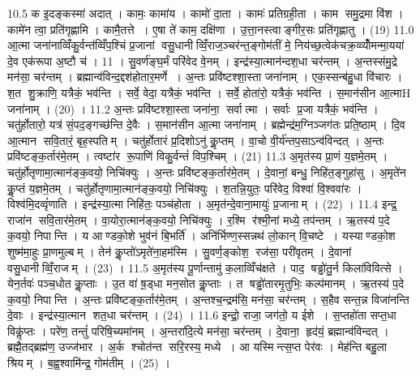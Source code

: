 10.5
क इ॒दङ्कस्मा॑ अदात् । कामः॒ कामा॑य । कामो॑ दा॒ता । कामः॑ प्रतिग्रही॒ता । काम समु॒द्रमा वि॑श । कामे॑न त्वा॒ प्रति॑गृह्णामि । कामै॒तत्ते । ए॒षा ते॑ काम॒ दक्षि॑णा । उ॒त्ता॒नस्त्वाङ्गीर॒सः प्रति॑गृह्णातु । (19)
11.0
आ॒त्मा जना॑नाव्विँकु॒र्वन्त॑व्विँप॒श्चिं प्र॒जानां वसु॒धानीव्विँ॒राज॒ञ्चर॑न्त॒ङ्गोम॑तीं मे॒ निय॑च्छ॒त्वेक॑चक्र॒व्व्योँ॑मन्मा॒यया॑ दे॒व एक॑रूपा अ॒ष्टौ च॑ । 11 ।
सु॒वर्ण॑ङ्घ॒र्मं परि॑वेद वे॒नम् । इन्द्र॑स्या॒त्मान॑न्दश॒धा चर॑न्तम् । अ॒न्तस्स॑मु॒द्रे मन॑सा॒ चर॑न्तम् । ब्रह्मान्व॑विन्द॒द्दश॑होतार॒मर्णे । अ॒न्तः प्रवि॑ष्टश्शा॒स्ता जना॑नाम् । एक॒स्सन्ब॑हु॒धा वि॑चारः । श॒त शु॒क्राणि॒ यत्रैकं॒ भव॑न्ति । सर्वे॒ वेदा॒ यत्रैकं॒ भव॑न्ति । सर्वे॒ होता॑रो॒ यत्रैकं॒ भव॑न्ति । स॒मान॑सीन आ॒त्माH जना॑नाम् । (20) ।
11.2
अ॒न्तः प्रवि॑ष्टश्शा॒स्ता जना॑ना॒ सर्वात्मा । सर्वाः प्र॒जा यत्रैकं॒ भव॑न्ति । चतु॑र्\mbox{}होतारो॒ यत्र॑ सं॒पद॒ङ्गच्छ॑न्ति दे॒वैः । स॒मान॑सीन आ॒त्मा जना॑नाम् । ब्रह्मेन्द्र॑म॒ग्निञ्जग॑तः प्रति॒ष्ठाम् । दि॒व आ॒त्मान सवि॒तारं॒ बृह॒स्पतिम् । चतु॑र्\mbox{}होतारं प्र॒दिशोऽनु॑ कॢ॒प्तम् । वा॒चो वी॒र्य॑न्तप॒साऽन्व॑विन्दत् । अ॒न्तः प्रवि॑ष्टङ्क॒र्तार॑मे॒तम् । त्वष्टा॑र रू॒पाणि॑ विकु॒र्वन्तं॑ विप॒श्चिम् । (21)
11.3
अ॒मृत॑स्य प्रा॒णं य॒ज्ञमे॒तम् । चतु॑र्\mbox{}होतृणामा॒त्मान॑ङ्क॒वयो॒ निचि॑क्युः । अ॒न्तः प्रवि॑ष्टङ्क॒र्तार॑मे॒तम् । दे॒वानां॒ बन्धु॒ निहि॑त॒ङ्गुहा॑सु । अ॒मृते॑न कॢ॒प्तं य॒ज्ञमे॒तम् । चतु॑र्\mbox{}होतृणामा॒त्मान॑ङ्क॒वयो॒ निचि॑क्युः । श॒तन्नि॒युतः॒ परि॑वेद॒ विश्वा॑ वि॒श्ववा॑रः । विश्व॑मि॒दव्वृं॑णाति । इन्द्र॑स्या॒त्मा निहि॑तः॒ पञ्च॑होता । अ॒मृत॑न्दे॒वाना॒मायुः॑ प्र॒जानाम् । (22) ।
11.4
इन्द्र॒ राजा॑न सवि॒तार॑मे॒तम् । वा॒योरा॒त्मान॑ङ्क॒वयो॒ निचि॑क्युः । र॒श्मि र॑श्मी॒नां मध्ये॒ तप॑न्तम् । ऋ॒तस्य॑ प॒दे क॒वयो॒ निपान्ति । य आण्डको॒शे भुव॑नं बि॒भर्ति॑ । अनि॑र्भिण्ण॒स्सन्नथ॑ लो॒कान् वि॒चष्टे । यस्याण्डको॒श शुष्म॑मा॒हुः प्रा॒णमुल्बम् । तेन॑ कॢ॒प्तो॑ऽमृते॑ना॒हम॑स्मि । सु॒वर्ण॒ङ्कोश॒ रज॑सा॒ परी॑वृतम् । दे॒वानां वसु॒धानीव्विँ॒राजम् । (23) ।
11.5
अ॒मृत॑स्य पू॒र्णान्तामु॑ क॒लाव्विँच॑क्षते । पाद॒ षड्ढो॑तु॒र्न किला॑विवित्से । येन॒र्तवः॑ पञ्च॒धोत कॢ॒प्ताः । उ॒त वा॑ ष़॒ड्धा मन॒सोत कॢ॒प्ताः । त षड्ढो॑तारमृ॒तुभिः॒ कल्प॑मानम् । ऋ॒तस्य॑ प॒दे क॒वयो॒ निपान्ति । अ॒न्तः प्रवि॑ष्टङ्क॒र्तार॑मे॒तम् । अ॒न्तश्च॒न्द्रम॑सि॒ मन॑सा॒ चर॑न्तम् । स॒हैव सन्त॒न्न विजा॑नन्ति दे॒वाः । इन्द्र॑स्या॒त्मान शत॒धा चर॑न्तम् । (24) ।
11.6
इन्द्रो॒ राजा॒ जग॑तो॒ य ईशे । स॒प्तहो॑ता सप्त॒धा विकॢ॑प्तः । परे॑ण॒ तन्तुं॑ परिषि॒च्यमा॑नम् । अ॒न्तरा॑दि॒त्ये मन॑सा॒ चर॑न्तम् । दे॒वाना॒ हृद॑यं॒ ब्रह्मान्व॑विन्दत् । ब्रह्मै॒तद्ब्रह्म॑ण॒ उज्ज॑भार । अ॒र्क श्चोत॑न्त सरि॒रस्य॒ मध्ये । आ यस्मिन्त्स॒प्त पेर॑वः । मेह॑न्ति बहु॒ला श्रियम् । ब॒ह्व॒श्वामि॑न्द्र॒ गोम॑तीम् । (25) ।

